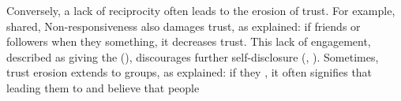Conversely, a lack of reciprocity often leads to the erosion of trust. For example,  shared,  Non-responsiveness also damages trust, as  explained: if friends or followers  when they  something, it decreases trust. This lack of engagement, described as giving the  (), discourages further self-disclosure (, ). Sometimes, trust erosion extends to groups, as  explained: if they , it often signifies that  leading them to  and believe that people 


